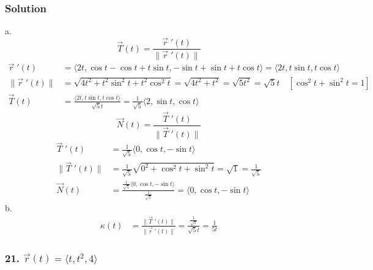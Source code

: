 \documentclass{article}
\newcommand{\drvec}{\vec{r}\;'(t)}
\begin{document}
\subsubsection*{Solution}
a. 
\[
    \vec{T}(t) = \frac{\drvec}{\|\drvec\|}   
\]
\begin{align*}
    \drvec &= \langle 2t, \cos t - \cos t + t\sin t, -\sin t + \sin t + t\cos t \rangle = \langle 2t, t\sin t, t\cos t \rangle \\
    \|\drvec\| &= \sqrt{4t^2 + t^2\sin^2t + t^2\cos^2t} = \sqrt{4t^2 + t^2} = \sqrt{5t^2} = \sqrt{5}t \quad [\cos^2t + \sin^2t = 1] \\ 
    \vec{T}(t) &= \frac{\langle 2t, t\sin t, t\cos t \rangle}{\sqrt{5}t} = \frac{1}{\sqrt{5}}\langle 2, \sin t, \cos t \rangle
\end{align*}
\[
    \vec{N}(t) = \frac{\vec{T}\;'(t)}{\|\vec{T}\;'(t)\|}
\]
\begin{align*}
    \vec{T}\;'(t) &= \frac{1}{\sqrt{5}}\langle 0, \cos t, -\sin t \rangle \\
    \|\vec{T}\;'(t)\| &= \frac {1}{\sqrt 5} \sqrt{0^2 + \cos^2t + \sin^2t} = \sqrt{1} = \frac{1}{\sqrt 5} \\
    \vec{N}(t) &= \frac{ \frac{1}{\sqrt{5}} \langle 0, \cos t, -\sin t \rangle}{\frac{1}{\sqrt{5}}} = \langle 0, \cos t, -\sin t \rangle 
\end{align*}
b. 
\begin{align*}
    \kappa(t) &= \frac{\|\vec{T}\;'(t)\|}{\|\drvec\|} = \frac{\frac{1}{\sqrt 5}}{\sqrt 5t} = \frac{1}{5t}
\end{align*}

\subsubsection*{21. $\vec{r}(t) = \langle{t, t^2, 4} \rangle$}
\end{document}
